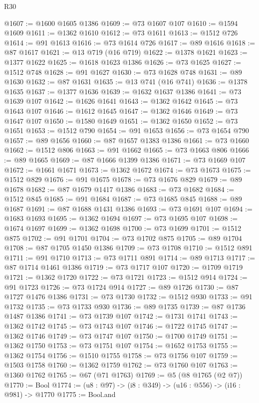 \begin{lexlean}{R30}
\begin{coremodule}
@1607 := @1600 @1605 @1386
@1609 := @73 @1607 @107
@1610 := @1594 @1609
@1611 := @1362 @1610
@1612 := @73 @1611
@1613 := @1512 @726
@1614 := @91 @1613
@1616 := @73 @1614 @726
@1617 := @89 @1616
@1618 := @87 @1617
@1621 := @13 @719 (@16 @719)
@1622 := @1378 @1621
@1623 := @1377 @1622
@1625 := @1618 @1623 @1386
@1626 := @73 @1625
@1627 := @1512 @748
@1628 := @91 @1627
@1630 := @73 @1628 @748
@1631 := @89 @1630
@1632 := @87 @1631
@1635 := @13 @741 (@16 @741)
@1636 := @1378 @1635
@1637 := @1377 @1636
@1639 := @1632 @1637 @1386
@1641 := @73 @1639 @107
@1642 := @1626 @1641
@1643 := @1362 @1642
@1645 := @73 @1643 @107
@1646 := @1612 @1645
@1647 := @1362 @1646
@1649 := @73 @1647 @107
@1650 := @1580 @1649
@1651 := @1362 @1650
@1652 := @73 @1651
@1653 := @1512 @790
@1654 := @91 @1653
@1656 := @73 @1654 @790
@1657 := @89 @1656
@1660 := @87 @1657 @1383 @1386
@1661 := @73 @1660
@1662 := @1512 @806
@1663 := @91 @1662
@1665 := @73 @1663 @806
@1666 := @89 @1665
@1669 := @87 @1666 @1399 @1386
@1671 := @73 @1669 @107
@1672 := @1661 @1671
@1673 := @1362 @1672
@1674 := @73 @1673
@1675 := @1512 @829
@1676 := @91 @1675
@1678 := @73 @1676 @829
@1679 := @89 @1678
@1682 := @87 @1679 @1417 @1386
@1683 := @73 @1682
@1684 := @1512 @845
@1685 := @91 @1684
@1687 := @73 @1685 @845
@1688 := @89 @1687
@1691 := @87 @1688 @1431 @1386
@1693 := @73 @1691 @107
@1694 := @1683 @1693
@1695 := @1362 @1694
@1697 := @73 @1695 @107
@1698 := @1674 @1697
@1699 := @1362 @1698
@1700 := @73 @1699
@1701 := @1512 @875
@1702 := @91 @1701
@1704 := @73 @1702 @875
@1705 := @89 @1704
@1708 := @87 @1705 @1450 @1386
@1709 := @73 @1708
@1710 := @1512 @891
@1711 := @91 @1710
@1713 := @73 @1711 @891
@1714 := @89 @1713
@1717 := @87 @1714 @1461 @1386
@1719 := @73 @1717 @107
@1720 := @1709 @1719
@1721 := @1362 @1720
@1722 := @73 @1721
@1723 := @1512 @914
@1724 := @91 @1723
@1726 := @73 @1724 @914
@1727 := @89 @1726
@1730 := @87 @1727 @1476 @1386
@1731 := @73 @1730
@1732 := @1512 @930
@1733 := @91 @1732
@1735 := @73 @1733 @930
@1736 := @89 @1735
@1739 := @87 @1736 @1487 @1386
@1741 := @73 @1739 @107
@1742 := @1731 @1741
@1743 := @1362 @1742
@1745 := @73 @1743 @107
@1746 := @1722 @1745
@1747 := @1362 @1746
@1749 := @73 @1747 @107
@1750 := @1700 @1749
@1751 := @1362 @1750
@1753 := @73 @1751 @107
@1754 := @1652 @1753
@1755 := @1362 @1754
@1756 := @1510 @1755
@1758 := @73 @1756 @107
@1759 := @1503 @1758
@1760 := @1362 @1759
@1762 := @73 @1760 @107
@1763 := @1360 @1762
@1765 := @67 (@71 @1763)
@1769 := @5 (@8 @1765 (@2 @7))
@1770 := Bool
@1774 := (u8 : @97) -> (i8 : @349) -> (u16 : @556) -> (i16 : @981) -> @1770
@1775 := Bool.and

\end{coremodule}
\end{lexlean}
